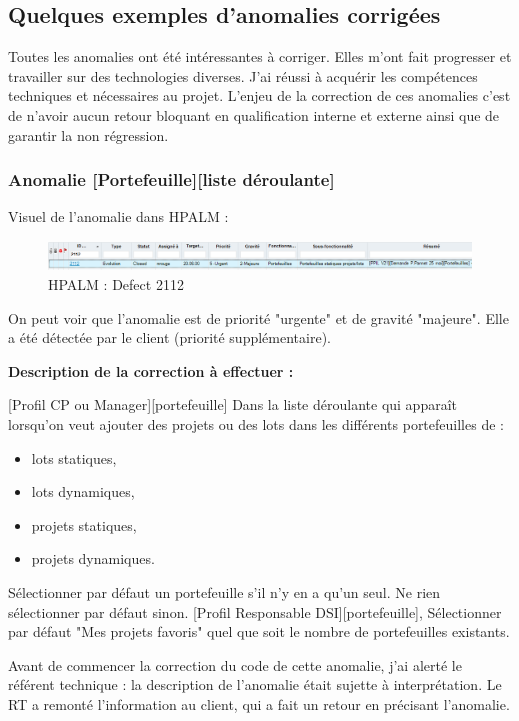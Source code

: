 \subsection{Quelques exemples d'anomalies corrigées}

Toutes les anomalies ont été intéressantes à corriger. Elles m'ont fait progresser et travailler sur des technologies diverses. J'ai réussi à acquérir les compétences techniques et nécessaires au projet. L'enjeu de la correction de ces anomalies c'est de n'avoir aucun retour bloquant en qualification interne et externe ainsi que de garantir la non régression.

\subsubsection{Anomalie [Portefeuille][liste déroulante]}

Visuel de l'anomalie dans HPALM :
\begin{figure}[!h]
\centering
\includegraphics[width=1\textwidth]{images/QC2120.PNG}
\caption{HPALM : Defect 2112}
\end{figure}

On peut voir que l'anomalie est de priorité "urgente" et de gravité "majeure". Elle a été détectée par le client (priorité supplémentaire).

\textbf{Description de la correction à effectuer :} 

[Profil CP ou Manager][portefeuille]
Dans la liste déroulante qui apparaît lorsqu'on veut ajouter des projets ou des lots dans les différents portefeuilles de : 
\begin{itemize}
    \item lots statiques,
    \item lots dynamiques,
    \item projets statiques,
    \item projets dynamiques.
\end{itemize}

Sélectionner par défaut un portefeuille s'il n'y en a qu'un seul. Ne rien sélectionner par défaut sinon. 
[Profil Responsable DSI][portefeuille], Sélectionner par défaut "Mes projets favoris" quel que soit le nombre de portefeuilles existants.

Avant de commencer la correction du code de cette anomalie, j'ai alerté le référent technique : la description de l'anomalie était sujette à interprétation. Le RT a remonté l'information au client, qui a fait un retour en précisant l'anomalie.

